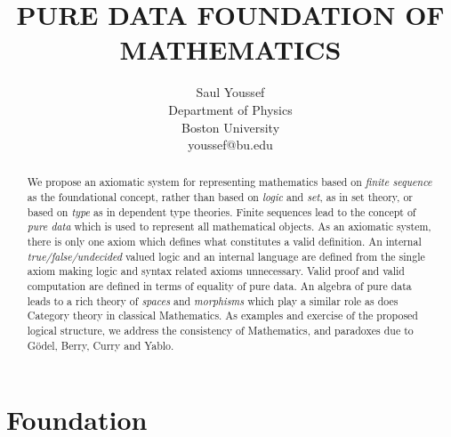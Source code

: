 \documentclass[11pt]{article}
\begin{document}
\title{\bf {PURE DATA FOUNDATION OF MATHEMATICS}}
\author{%
  Saul Youssef%
  \hfil \\
  Department of Physics \\
  Boston University \\
  youssef@bu.edu\\
}
\maketitle
\begin{abstract}
We propose an axiomatic system for representing mathematics based on {\it finite sequence} as the foundational concept, rather than based on {\it logic} and {\it set}, as in set theory, or based on {\it type} as in dependent type theories.  Finite sequences lead to the concept of {\it pure data} which is 
used to represent all mathematical objects.  As an axiomatic system, there is only one axiom which 
defines what constitutes a valid definition.  An internal {\it true/false/undecided} valued logic and an internal language are defined from the single axiom 
making logic and syntax related axioms unnecessary.  Valid proof and valid computation are defined in terms of equality of pure data.  An algebra of pure data 
leads to a rich theory of {\it spaces} and {\it morphisms} which play a similar role as does Category theory in classical Mathematics.  As examples and 
exercise of the proposed logical structure, we address the consistency of Mathematics, and paradoxes due to G\"odel, Berry, Curry and Yablo.
\end{abstract}

\section{Foundation}
\end{document}
